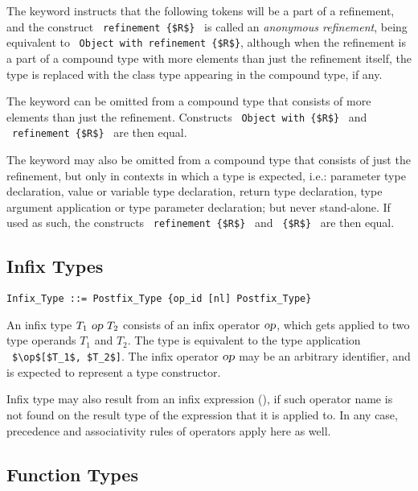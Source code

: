 The keyword  instructs that the following tokens will be a part of a refinement, and the construct ~\lstinline!refinement {$R$}!~ is called an {\em anonymous refinement}, being equivalent to ~\lstinline!Object with refinement {$R$}!, although when the refinement is a part of a compound type with more elements than just the refinement itself, the  type is replaced with the class type appearing in the compound type, if any. 

The  keyword can be omitted from a compound type that consists of more elements than just the refinement. Constructs ~\lstinline!Object with {$R$}!~ and ~\lstinline!refinement {$R$}!~ are then equal. 

The  keyword may also be omitted from a compound type that consists of just the refinement, but only in contexts in which a type is expected, i.e.: parameter type declaration, value or variable type declaration, return type declaration, type argument application or type parameter declaration; but never stand-alone. If used as such, the constructs ~\lstinline!refinement {$R$}!~ and ~\lstinline!{$R$}!~ are then equal. 






\subsection{Infix Types}
\label{sec:infix-types}

\syntax\begin{lstlisting}
Infix_Type ::= Postfix_Type {op_id [nl] Postfix_Type}
\end{lstlisting}

An infix type $T_1\ \mbox{\sl op}\ T_2$ consists of an infix operator $\mbox{\sl op}$, which gets applied to two type operands $T_1$ and $T_2$. The type is equivalent to the type application ~\lstinline!$\op$[$T_1$, $T_2$]!. The infix operator $\mbox{\sl op}$ may be an arbitrary identifier, and is expected to represent a type constructor. 

Infix type may also result from an infix expression (), if such operator name is not found on the result type of the expression that it is applied to. In any case, precedence and associativity rules of operators apply here as well. 






\subsection{Function Types}
\label{sec:function-types}

